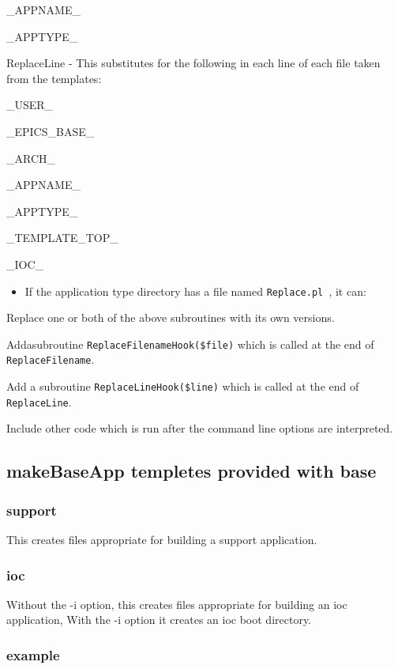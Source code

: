  \_APPNAME\_  

\_APPTYPE\_

ReplaceLine - This substitutes for the following in each line of each file taken from the templates:                 

 \_USER\_  

 \_EPICS\_BASE\_ 

 \_ARCH\_ 

 \_APPNAME\_ 

 \_APPTYPE\_ 

 \_TEMPLATE\_TOP\_ 

 \_IOC\_ 

\begin{itemize}\item If the application type directory has a file named \verb|Replace.pl |, it can:

\end{itemize}Replace one or both of the above subroutines with its own versions.

Addasubroutine \verb|ReplaceFilenameHook($file)| which is called at the end of \verb|ReplaceFilename|. 

Add a subroutine \verb|ReplaceLineHook($line)| which is called at the end of \verb|ReplaceLine|.

Include other code which is run after the command line options are interpreted.

\subsection{makeBaseApp templetes provided with base}

\subsubsection{support}

This creates files appropriate for building a support application.

\subsubsection{ioc}

 Without the -i option, this creates files appropriate for building an ioc application, With the -i option it creates an ioc boot 
directory.

\subsubsection{example}

